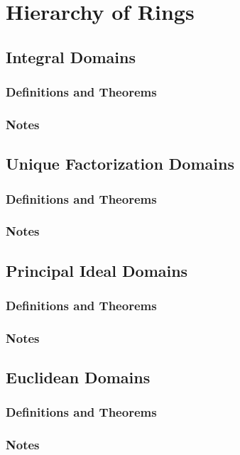 \chapter{Hierarchy of Rings}

\section{Integral Domains}
\subsection*{Definitions and Theorems}
\subsection*{Notes}

\section{Unique Factorization Domains}
\subsection*{Definitions and Theorems}
\subsection*{Notes}

\section{Principal Ideal Domains}
\subsection*{Definitions and Theorems}
\subsection*{Notes}

\section{Euclidean Domains}
\subsection*{Definitions and Theorems}
\subsection*{Notes}